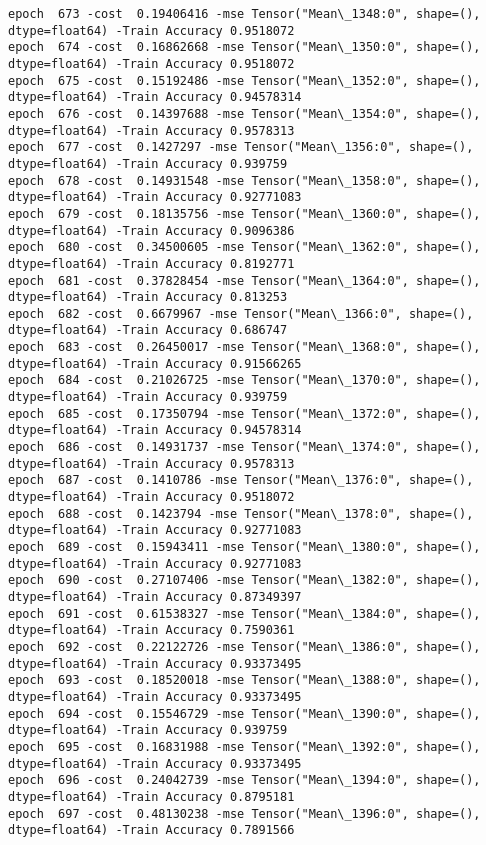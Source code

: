 \documentclass[11pt]{article}
\begin{document}
\begin{Verbatim}[commandchars=\\\{\}]
epoch  673 -cost  0.19406416 -mse Tensor("Mean\_1348:0", shape=(), dtype=float64) -Train Accuracy 0.9518072
epoch  674 -cost  0.16862668 -mse Tensor("Mean\_1350:0", shape=(), dtype=float64) -Train Accuracy 0.9518072
epoch  675 -cost  0.15192486 -mse Tensor("Mean\_1352:0", shape=(), dtype=float64) -Train Accuracy 0.94578314
epoch  676 -cost  0.14397688 -mse Tensor("Mean\_1354:0", shape=(), dtype=float64) -Train Accuracy 0.9578313
epoch  677 -cost  0.1427297 -mse Tensor("Mean\_1356:0", shape=(), dtype=float64) -Train Accuracy 0.939759
epoch  678 -cost  0.14931548 -mse Tensor("Mean\_1358:0", shape=(), dtype=float64) -Train Accuracy 0.92771083
epoch  679 -cost  0.18135756 -mse Tensor("Mean\_1360:0", shape=(), dtype=float64) -Train Accuracy 0.9096386
epoch  680 -cost  0.34500605 -mse Tensor("Mean\_1362:0", shape=(), dtype=float64) -Train Accuracy 0.8192771
epoch  681 -cost  0.37828454 -mse Tensor("Mean\_1364:0", shape=(), dtype=float64) -Train Accuracy 0.813253
epoch  682 -cost  0.6679967 -mse Tensor("Mean\_1366:0", shape=(), dtype=float64) -Train Accuracy 0.686747
epoch  683 -cost  0.26450017 -mse Tensor("Mean\_1368:0", shape=(), dtype=float64) -Train Accuracy 0.91566265
epoch  684 -cost  0.21026725 -mse Tensor("Mean\_1370:0", shape=(), dtype=float64) -Train Accuracy 0.939759
epoch  685 -cost  0.17350794 -mse Tensor("Mean\_1372:0", shape=(), dtype=float64) -Train Accuracy 0.94578314
epoch  686 -cost  0.14931737 -mse Tensor("Mean\_1374:0", shape=(), dtype=float64) -Train Accuracy 0.9578313
epoch  687 -cost  0.1410786 -mse Tensor("Mean\_1376:0", shape=(), dtype=float64) -Train Accuracy 0.9518072
epoch  688 -cost  0.1423794 -mse Tensor("Mean\_1378:0", shape=(), dtype=float64) -Train Accuracy 0.92771083
epoch  689 -cost  0.15943411 -mse Tensor("Mean\_1380:0", shape=(), dtype=float64) -Train Accuracy 0.92771083
epoch  690 -cost  0.27107406 -mse Tensor("Mean\_1382:0", shape=(), dtype=float64) -Train Accuracy 0.87349397
epoch  691 -cost  0.61538327 -mse Tensor("Mean\_1384:0", shape=(), dtype=float64) -Train Accuracy 0.7590361
epoch  692 -cost  0.22122726 -mse Tensor("Mean\_1386:0", shape=(), dtype=float64) -Train Accuracy 0.93373495
epoch  693 -cost  0.18520018 -mse Tensor("Mean\_1388:0", shape=(), dtype=float64) -Train Accuracy 0.93373495
epoch  694 -cost  0.15546729 -mse Tensor("Mean\_1390:0", shape=(), dtype=float64) -Train Accuracy 0.939759
epoch  695 -cost  0.16831988 -mse Tensor("Mean\_1392:0", shape=(), dtype=float64) -Train Accuracy 0.93373495
epoch  696 -cost  0.24042739 -mse Tensor("Mean\_1394:0", shape=(), dtype=float64) -Train Accuracy 0.8795181
epoch  697 -cost  0.48130238 -mse Tensor("Mean\_1396:0", shape=(), dtype=float64) -Train Accuracy 0.7891566

\end{Verbatim}
\end{document}
